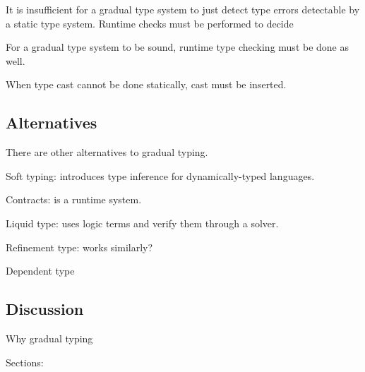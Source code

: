 It is insufficient for a gradual type system to just detect type errors detectable
by a static type system. Runtime checks must be performed to decide


For a gradual type system to be sound, runtime type checking must be done as well.

When type cast cannot be done statically, cast must be inserted.

\subsection{Alternatives}

There are other alternatives to gradual typing.

Soft typing: introduces type inference for dynamically-typed languages.

Contracts: is a runtime system.

Liquid type: uses logic terms and verify them through a solver.

Refinement type: works similarly?

Dependent type

\subsection{Discussion}

Why gradual typing

Sections:

